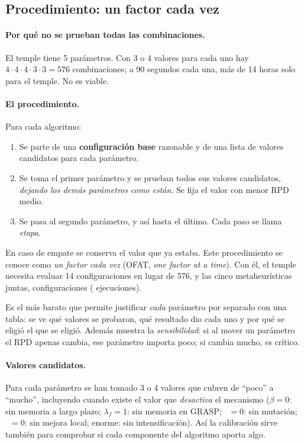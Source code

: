 \subsection{Procedimiento: un factor cada vez}\label{sec:ofat}

\paragraph{Por qué no se prueban todas las combinaciones.} El temple tiene 5 parámetros. Con
3 o 4 valores para cada uno hay $4\cdot4\cdot4\cdot3\cdot3=576$ combinaciones; a 90 segundos
cada una, más de 14 horas solo para el temple. No es viable.

\paragraph{El procedimiento.} Para cada algoritmo:
\begin{enumerate}
  \item Se parte de una \textbf{configuración base} razonable y de una lista de valores
        candidatos para cada parámetro.
  \item Se toma el primer parámetro y se prueban todos sus valores candidatos,
        \emph{dejando los demás parámetros como están}. Se fija el valor con menor RPD
        medio.
  \item Se pasa al segundo parámetro, y así hasta el último. Cada paso se llama
        \emph{etapa}.
\end{enumerate}
En caso de empate se conserva el valor que ya estaba. Este procedimiento se conoce como
\emph{un factor cada vez} (OFAT, \emph{one factor at a time}). Con él, el temple necesita
evaluar 14 configuraciones en lugar de 576, y las cinco metaheurísticas juntas,
 configuraciones ( ejecuciones).

\begin{decision}
Es el más barato que permite justificar \emph{cada} parámetro por separado con una tabla: se
ve qué valores se probaron, qué resultado dio cada uno y por qué se eligió el que se eligió.
Además muestra la \emph{sensibilidad}: si al mover un parámetro el RPD apenas cambia, ese
parámetro importa poco; si cambia mucho, es crítico.
\end{decision}

\paragraph{Valores candidatos.} Para cada parámetro se han tomado 3 o 4 valores que cubren
de ``poco'' a ``mucho'', incluyendo cuando existe el valor que \emph{desactiva} el mecanismo
($\beta=0$: sin memoria a largo plazo; $\lambda_f=1$: sin memoria en GRASP; ~$=0$:
sin mutación; ~$=0$: sin mejora local;  enorme: sin intensificación).
Así la calibración sirve también para comprobar si cada componente del algoritmo aporta algo.

